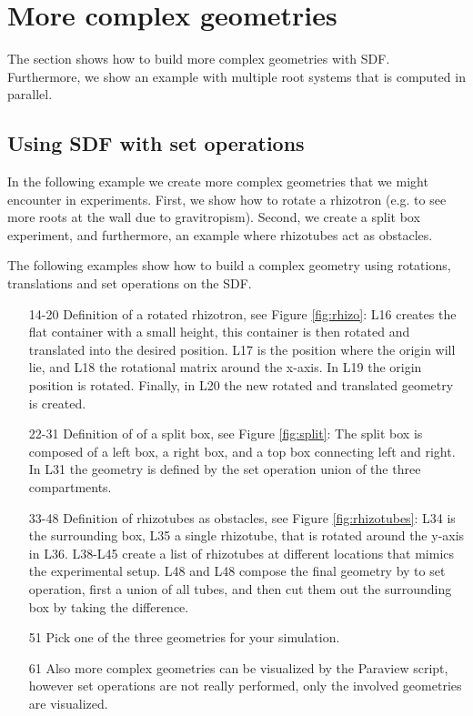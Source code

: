 \documentclass[a4paper]{article}
\begin{document}
\section{More complex geometries}

The section shows how to build more complex geometries with SDF. 
Furthermore, we show an example with multiple root systems that is computed in parallel.

\subsection{Using SDF with set operations}

In the following example we create more complex geometries that we might encounter in experiments. 
First, we show how to rotate a rhizotron (e.g. to see more roots at the wall due to gravitropism). 
Second, we create a split box experiment, and furthermore, an example where rhizotubes act as obstacles.

The following examples show how to build a complex geometry using rotations, translations and set operations on the SDF.



\begin{itemize}

\item[14-20] Definition of a rotated rhizotron, see Figure \ref{fig:rhizo}: L16 creates the flat container with a small height, this container is then rotated and translated into the desired position. 
L17 is the position where the origin will lie, and L18 the rotational matrix around the x-axis. 
In L19 the origin position is rotated. Finally, in L20 the new rotated and translated geometry is created. 
\item[22-31] Definition of of a split box, see Figure \ref{fig:split}: The split box is composed of a left box, a right box, and a top box connecting left and right. In L31 the geometry is defined by the set operation union of the three compartments. 
\item[33-48] Definition of rhizotubes as obstacles, see Figure \ref{fig:rhizotubes}: L34 is the surrounding box, L35 a single rhizotube, that is rotated around the y-axis in L36. L38-L45 create a list of rhizotubes at different locations that mimics the experimental setup. 
L48 and L48 compose the final geometry by to set operation, first a union of all tubes, and then cut them out the surrounding box by taking the difference. 
\item[51] Pick one of the three geometries for your simulation.
\item[61] Also more complex geometries can be visualized by the Paraview script, however set operations are not really performed, only the involved geometries are visualized.

\end{itemize}
\end{document}

